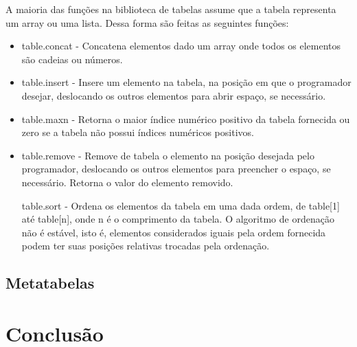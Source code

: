 \documentclass[
12pt, %
openright, %
oneside, %
a4paper, %
english, %
brazil, %
]{abntex2}
\begin{document}
A maioria das funções na biblioteca de tabelas assume que a tabela representa um array ou uma lista. Dessa forma são feitas as seguintes funções:

\begin{itemize}

\item table.concat - Concatena elementos dado um array onde todos os elementos são cadeias ou números.

\item table.insert - Insere um elemento na tabela, na posição em que o programador desejar, deslocando os outros elementos para abrir espaço, se necessário.

\item table.maxn - Retorna o maior índice numérico positivo da tabela fornecida ou zero se a tabela não possui índices numéricos positivos.

\item table.remove - Remove de tabela o elemento na posição desejada pelo programador, deslocando os outros elementos para preencher o espaço, se necessário. Retorna o valor do elemento removido.

table.sort - Ordena os elementos da tabela em uma dada ordem, de table[1] até table[n], onde n é o comprimento da tabela. 
O algoritmo de ordenação não é estável, isto é, elementos considerados iguais pela ordem fornecida podem ter suas posições relativas trocadas pela ordenação.
\end{itemize}

\section{Metatabelas}



\chapter{Conclusão}


\postextual





\end{document}
